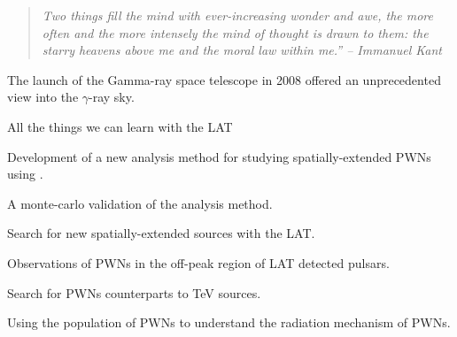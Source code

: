 
\begin{quote}
\em{Two things fill the mind with ever-increasing wonder and awe,
the more often and the more intensely the mind of thought is drawn to
them: the starry heavens above me and the moral law within me.'' -- Immanuel Kant}
\end{quote}

The launch of the \fermi Gamma-ray space telescope in 2008 offered
an unprecedented view into the $\gamma$-ray sky.

All the things we can learn with the \gls{LAT}

Development of a new analysis method for studying spatially-extended \glspl{PWN}
using \pointlike.

A monte-carlo validation of the analysis method.

Search for new spatially-extended sources with the \gls{LAT}.

Observations of \glspl{PWN} in the off-peak region of \gls{LAT} detected pulsars.

Search for \glspl{PWN} counterparts to TeV sources.

Using the population of \glspl{PWN} to understand the radiation mechanism of \glspl{PWN}.
